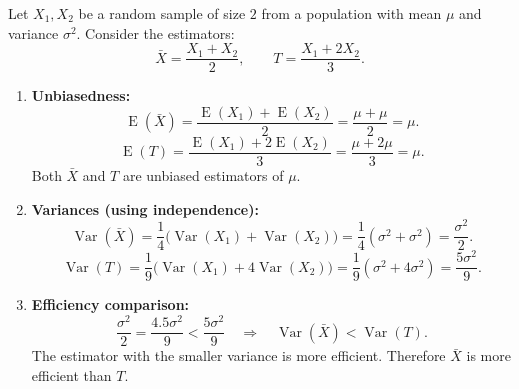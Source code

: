 \documentclass[11pt]{article}
\begin{document}
\begin{corrige}
Let \(X_1, X_2\) be a random sample of size \(2\) from a population with mean \(\mu\) and variance \(\sigma^2\). Consider the estimators:
\[
\bar{X} = \frac{X_1+X_2}{2},\qquad T = \frac{X_1+2X_2}{3}.
\]

\begin{enumerate}
\item \textbf{Unbiasedness:}
\[
\operatorname{E}(\bar{X}) = \frac{\operatorname{E}(X_1)+\operatorname{E}(X_2)}{2} = \frac{\mu+\mu}{2} = \mu.
\]
\[
\operatorname{E}(T) = \frac{\operatorname{E}(X_1)+2\operatorname{E}(X_2)}{3} = \frac{\mu+2\mu}{3} = \mu.
\]
Both \(\bar{X}\) and \(T\) are unbiased estimators of \(\mu\).

\item \textbf{Variances (using independence):}
\[
\operatorname{Var}(\bar{X}) = \frac{1}{4}\bigl(\operatorname{Var}(X_1)+\operatorname{Var}(X_2)\bigr) = \frac{1}{4}(\sigma^2+\sigma^2) = \frac{\sigma^2}{2}.
\]
\[
\operatorname{Var}(T) = \frac{1}{9}\bigl(\operatorname{Var}(X_1)+4\operatorname{Var}(X_2)\bigr) = \frac{1}{9}(\sigma^2+4\sigma^2) = \frac{5\sigma^2}{9}.
\]

\item \textbf{Efficiency comparison:}
\[
\frac{\sigma^2}{2} = \frac{4.5\sigma^2}{9} < \frac{5\sigma^2}{9} \quad\Longrightarrow\quad \operatorname{Var}(\bar{X}) < \operatorname{Var}(T).
\]
The estimator with the smaller variance is more efficient. Therefore \(\bar{X}\) is more efficient than \(T\).
\end{enumerate}
\end{corrige}
\end{document}
